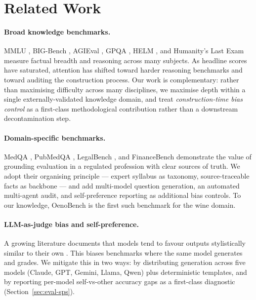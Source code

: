 \section{Related Work}
\label{sec:related}

\paragraph{Broad knowledge benchmarks.} MMLU
\citep{hendrycks2021mmlu}, BIG-Bench \citep{srivastava2023bigbench},
AGIEval \citep{zhong2024agieval}, GPQA \citep{rein2024gpqa}, HELM
\citep{liang2023helm}, and Humanity's Last Exam \citep{phan2025hle}
measure factual breadth and reasoning across many subjects. As headline
scores have saturated, attention has shifted toward harder reasoning
benchmarks and toward auditing the construction process. Our work is
complementary: rather than maximising difficulty across many
disciplines, we maximise depth within a single externally-validated
knowledge domain, and treat \emph{construction-time bias control} as a
first-class methodological contribution rather than a downstream
decontamination step.

\paragraph{Domain-specific benchmarks.} MedQA
\citep{jin2021medqa}, PubMedQA \citep{jin2019pubmedqa}, LegalBench
\citep{guha2023legalbench}, and FinanceBench \citep{islam2023financebench}
demonstrate the value of grounding evaluation in a regulated profession
with clear sources of truth. We adopt their organising principle ---
expert syllabus as taxonomy, source-traceable facts as backbone --- and
add multi-model question generation, an automated multi-agent audit, and
self-preference reporting as additional bias controls. To our knowledge,
OenoBench is the first such benchmark for the wine domain.

\paragraph{LLM-as-judge bias and self-preference.} A growing literature
documents that models tend to favour outputs stylistically similar to
their own \citep{panickssery2024selfpref, zheng2023judging,
sharma2024sycophancy}. This biases benchmarks where the same model
generates and grades. We mitigate this in two ways: by distributing
generation across five models (Claude, GPT, Gemini, Llama, Qwen) plus
deterministic templates, and by reporting per-model self-vs-other
accuracy gaps as a first-class diagnostic (Section~\ref{sec:eval-sps}).

